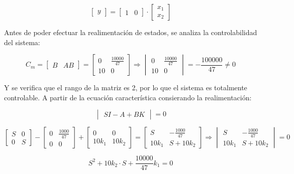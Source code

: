 \documentclass{article}
\begin{document}
\[
\begin{bmatrix}
y
\end{bmatrix}
=
\begin{bmatrix}
1 & 0 
\end{bmatrix}
\cdot
\begin{bmatrix}
x_1 \\
x_2 
\end{bmatrix}
\]

Antes de poder efectuar la realimentación de estados, se analiza la controlabilidad del sistema:

\[
C_m
=
\begin{bmatrix}
B & AB
\end{bmatrix}
=
\begin{bmatrix}
0 & \frac{10000}{47} \\
10 & 0 
\end{bmatrix}
\Longrightarrow
\begin{vmatrix}
0 & \frac{10000}{47} \\
10 & 0 
\end{vmatrix}
=
-\frac{100000}{47}
\not=
0
\]

Y se verifica que el rango de la matriz es 2, por lo que el sistema es totalmente controlable.
A partir de la ecuación característica consierando la realimentación:

\[
\begin{vmatrix}
SI-A+BK
\end{vmatrix}
=0
\]

\[
\begin{bmatrix}
S & 0 \\
0 & S
\end{bmatrix}
-
\begin{bmatrix}
0 & \frac{1000}{47} \\
0 & 0
\end{bmatrix}
+
\begin{bmatrix}
0 & 0 \\
10k_1 & 10k_2
\end{bmatrix}
=
\begin{bmatrix}
S & -\frac{1000}{47} \\
10k_1 & S+10k_2
\end{bmatrix}
\Longrightarrow
\begin{vmatrix}
S & -\frac{1000}{47} \\
10k_1 & S+10k_2
\end{vmatrix}
=0
\]

\[
S^2 + 10k_2 \cdot S + \frac{10000}{47}k_1 = 0
\]
\end{document}
